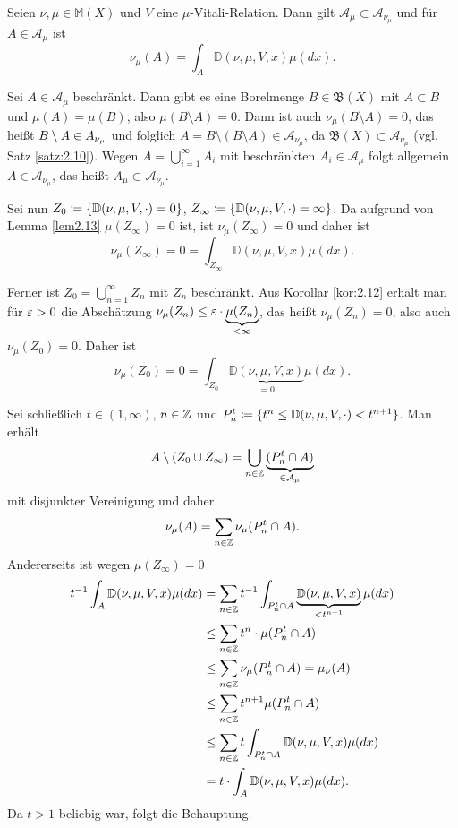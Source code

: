 \documentclass[a4paper,twoside,DIV15,BCOR12mm]{scrbook}
\newcommand{\A}{\mathcal A}
\newcommand{\borel}{\mathfrak B}
\begin{document}
\begin{satz}
\label{satz:2.15}
Seien $\nu,\mu\in\mathbb M(X)$ und $V$ eine $\mu$-Vitali-Relation. Dann gilt $\A_\mu \subset \A_{\nu_\mu}$ und für $A\in\A_\mu$ ist
\[
\nu_\mu(A) = \int_A \mathbb D(\nu,\mu,V,x)\mu(dx).
\]
\end{satz}

\begin{beweis}
Sei $A\in\A_\mu$ beschränkt. Dann gibt es eine Borelmenge $B\in\borel(X)$ mit $A\subset B$ und $\mu(A) = \mu(B)$, also $\mu(B\setminus A)=0$.  Dann ist auch $\nu_\mu(B\setminus A) = 0$, das heißt $B\setminus  A \in \mathcal \A_{\nu_\mu}$ und folglich $A = B \setminus (B\setminus A) \in \A_{\nu_\mu}$, da $\borel(X)\subset\A_{\nu_\mu}$ (vgl.
Satz \ref{satz:2.10}). Wegen $A = \bigcup_{i=1}^\infty A_i$ mit beschränkten $A_i \in \A_\mu$ folgt allgemein $A\in\A_{\nu_\mu}$, das heißt $A_\mu\subset\A_{\nu_\mu}$.

Sei nun $Z_0 \da \{ \mathbb D(\nu,\mu,V,\cdot) = 0 \}$, $Z_\infty \da \{ \mathbb D(\nu,\mu,V,\cdot) = \infty \}$. Da aufgrund von Lemma \ref{lem2.13} $\mu(Z_\infty)  = 0$ ist, ist $\nu_\mu(Z_\infty) = 0$ und daher ist
\[
\nu_\mu(Z_\infty) = 0 = \int_{Z_\infty} \mathbb D(\nu,\mu,V,x) \mu(dx).
\]

Ferner ist $Z_0 = \bigcup_{n=1}^\infty Z_n$ mit $Z_n$ beschränkt. Aus Korollar \ref{kor:2.12} erhält man für $\varepsilon>0$ die Abschätzung $\nu_\mu(Z_n) \le \varepsilon \cdot \underbrace{\mu(Z_n)}_{<\infty}$, das heißt $\nu_\mu(Z_n)=0$, also auch $\nu_\mu(Z_0)=0$. Daher ist
\[
\nu_\mu(Z_0) = 0 = \int_{Z_0} \underbrace{\mathbb D(\nu,\mu,V,x)}_{=0} \mu(dx).
\]

Sei schließlich $t\in(1,\infty)$, $n\in\mathbb{Z}$ und $P_n^t \da \{t^n \le \mathbb D(\nu,\mu,V,\cdot) < t^{n+1}\}$. Man erhält
\[
A\setminus(Z_0\cup Z_\infty) = \bigcup_{n\in\MdZ} \underbrace{(P_n^t \cap A)}_{\in\A_\mu}
\]
mit disjunkter Vereinigung und daher 
\[
\nu_\mu(A) = \sum_{n\in\mathbb{Z}}\nu_\mu(P_n^t \cap A).
\]
Andererseits ist wegen $\mu(Z_\infty)=0$
\begin{align*}
t^{-1} \int_A \mathbb D(\nu,\mu,V,x)\mu(dx)
&= \sum_{n\in\mathbb{Z}} t^{-1} \int_{P_n^t\cap A} \underbrace{\mathbb D(\nu,\mu,V,x)}_{<t^{n+1}}\mu(dx) \\
&\le \sum_{n\in\mathbb{Z}} t^n \cdot \mu(P_n^t \cap A) \\
&\le \sum_{n\in\mathbb{Z}} \nu_\mu(P_n^t \cap A) = \mu_\nu(A) \\
&\le \sum_{n\in\mathbb{Z}} t^{n+1} \mu(P_n^t \cap A) \\
&\le \sum_{n\in\mathbb{Z}} t \int_{P_n^t \cap A} \mathbb D(\nu,\mu,V,x)\mu(dx) \\
&= t \cdot \int_A \mathbb D(\nu,\mu,V,x)\mu(dx).
\end{align*}
Da $t>1$ beliebig war, folgt die Behauptung.
\end{beweis}
\end{document}
